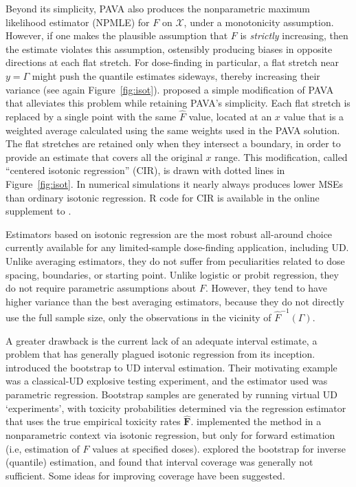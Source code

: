 Beyond its simplicity, PAVA also produces the nonparametric maximum likelihood estimator (NPMLE) for $F$ on $\mathcal{X}$, under a monotonicity assumption. However, if one makes the plausible assumption that $F$ is \emph{strictly} increasing, then the estimate violates this assumption, ostensibly producing biases in opposite directions at each flat stretch. For dose-finding in particular, a flat stretch near $y=\Gamma$ might push the quantile estimates sideways, thereby increasing their variance (see again Figure~\ref{fig:isot}). \cite[Section~3.3]{Oron07} proposed a simple modification of PAVA that alleviates this problem while retaining PAVA's simplicity. Each flat stretch is replaced by a single point with the same $\hat{F}$ value, located at an $x$ value that is a weighted average calculated using the same weights used in the PAVA solution. The flat stretches are retained only when they intersect a boundary, in order to provide an estimate that covers all the original $x$ range. This modification, called ``centered isotonic regression'' (CIR), is drawn with dotted lines in Figure~\ref{fig:isot}. In numerical simulations it nearly always produces lower MSEs than ordinary isotonic regression. R code for CIR is available in the online supplement to \cite{Oron:Hoff:smal:2013}.

Estimators based on isotonic regression are the most robust all-around choice currently available for any limited-sample dose-finding application, including UD. Unlike averaging estimators, they do not suffer from peculiarities related to dose spacing, boundaries, or starting point. Unlike logistic or probit regression, they do not require parametric assumptions about $F$. However, they tend to have higher variance than the best averaging estimators, because they do not directly use the full sample size, only the observations in the vicinity of $\hat{F}^{-1}(\Gamma)$.

A greater drawback is the current lack of an adequate interval estimate, a problem that has generally plagued isotonic regression from its inception. \cite{Chao:Fuh:boot:2001} introduced the bootstrap to UD interval estimation. Their motivating example was a classical-UD explosive testing experiment, and the estimator used was parametric regression. Bootstrap samples are generated by running virtual UD `experiments', with toxicity probabilities determined via the regression estimator that uses the true empirical toxicity rates $\mathbf{\hat{F}}$.  \cite{Styl:Pros:Flou:esti:2003} implemented the method in a nonparametric context via isotonic regression, but only for forward estimation (i.e, estimation of $F$ values at specified doses). \cite[Section~3.3]{Oron07} explored the bootstrap for inverse (quantile) estimation, and found that interval coverage was generally not sufficient. Some ideas for improving coverage have been suggested.

